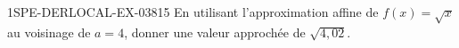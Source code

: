 \begin{exercice}{1SPE-DERLOCAL-EX-038}{1}{5}
En utilisant l'approximation affine de $f(x)=\sqrt{x}$ au voisinage de $a=4$, donner une valeur approchée de $\sqrt{4{,}02}$.
\end{exercice}
